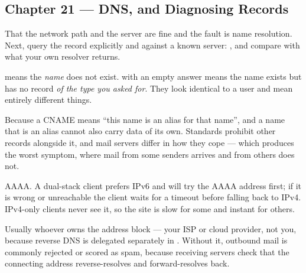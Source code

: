 \subsection*{Chapter 21 --- DNS, and Diagnosing Records}
\begin{tightnum}
  \item That the network path and the server are fine and the fault is name
        resolution. Next, query the record explicitly and against a known server:
        , and compare with what your
        own resolver returns.
  \item {} means the \emph{name} does not exist.  with an
        empty answer means the name exists but has no record \emph{of the type you
        asked for}. They look identical to a user and mean entirely different
        things.
  \item Because a CNAME means ``this name is an alias for that name'', and a name
        that is an alias cannot also carry data of its own. Standards prohibit
        other records alongside it, and mail servers differ in how they cope ---
        which produces the worst symptom, where mail from some senders arrives
        and from others does not.
  \item AAAA. A dual-stack client prefers IPv6 and will try the AAAA address
        first; if it is wrong or unreachable the client waits for a timeout before
        falling back to IPv4. IPv4-only clients never see it, so the site is slow
        for some and instant for others.
  \item Usually whoever owns the address block --- your ISP or cloud provider, not
        you, because reverse DNS is delegated separately in
        . Without it, outbound mail is commonly rejected or
        scored as spam, because receiving servers check that the connecting
        address reverse-resolves and forward-resolves back.
\end{tightnum}

